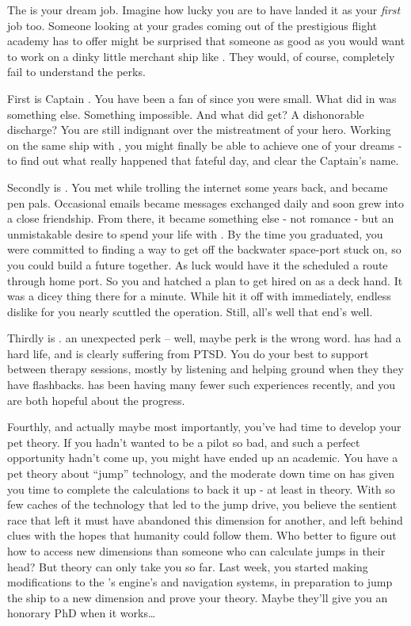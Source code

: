 \documentclass[char]{TMFHope}
\begin{document}
\name{\cNav{}}

The \pNew{} is your dream job. Imagine how lucky you are to have landed it as your {\em first} job too. Someone looking at your grades coming out of the prestigious flight academy \pHome{} has to offer might be surprised that someone as good as you would want to work on a dinky little merchant ship like \pNew{}. They would, of course, completely fail to understand the perks.

First is Captain \cCap{\full}. You have been a fan\cNav{\kid} of \cCap{\theirs} since you were small. What \pOld{} did in \pBattle{} was something else. Something impossible. And what did \cCap{} get? A dishonorable discharge? You are still indignant over the mistreatment of your hero. Working on the same ship with \cCap{\them}, you might finally be able to achieve one of your dreams - to find out what really happened that fateful day, and clear the Captain's name.

Secondly is \cBoy{\full}. You met while trolling the internet some years back, and became pen pals. Occasional emails became messages exchanged daily and soon grew into a close friendship. From there, it became something else - not romance - but an unmistakable desire to spend your life with \cBoy{\them}. By the time you graduated, you were committed to finding a way to get \cBoy{} off the backwater space-port \cBoy{\they} \cBoy{\were} stuck on, so you could build a future together. As luck would have it the \pNew{} scheduled a route through \cBoy{\their} home port. So you and \cBoy{} hatched a plan to get \cBoy{\them} hired on as a deck hand. It was a dicey thing there for a minute. While \cEng{} hit it off with \cBoy{} immediately, \cEng{\their} endless dislike for you nearly scuttled the operation. Still, all's well that end's well.

Thirdly is \cWeap{}. \cWeap{\They} \cWeap{\are} an unexpected perk -- well, maybe perk is the wrong word. \cWeap{} has had a hard life, and is clearly suffering from PTSD. You do your best to support \cWeap{\them} between \cWeap{\their} therapy sessions, mostly by listening and helping \cWeap{\them} ground when they they have flashbacks. \cWeap{} has been having many fewer such experiences recently, and you are both hopeful about the progress.

Fourthly, and actually maybe most importantly, you've had time to develop your pet theory. If you hadn't wanted to be a pilot so bad, and such a perfect opportunity hadn't come up, you might have ended up an academic. You have a pet theory about ``jump'' technology, and the moderate down time on \pNew{} has given you time to complete the calculations to back it up - at least in theory. With so few caches of the technology that led to the jump drive, you believe the sentient race that left it must have abandoned this dimension for another, and left behind clues with the hopes that humanity could follow them. Who better to figure out how to access new dimensions than someone who can calculate jumps in their head? But theory can only take you so far. Last week, you started making modifications to the \pNew{}'s engine's and navigation systems, in preparation to jump the ship to a new dimension and prove your theory. Maybe they'll give you an honorary PhD when it works\ldots
\end{document}
